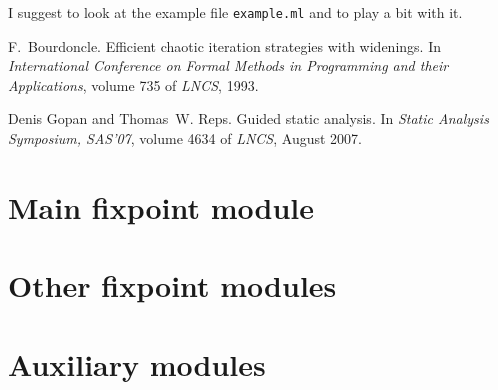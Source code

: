 \documentclass[twoside,10pt,a4paper]{report}
\begin{document}
I suggest to look at the example file \texttt{example.ml}
and to play a bit with it.

\begin{thebibliography}{Bou93}

F.~Bourdoncle.
\newblock Efficient chaotic iteration strategies with widenings.
\newblock In {\em International Conference on Formal Methods in Programming and
  their Applications}, volume 735 of {\em LNCS}, 1993.

Denis Gopan and Thomas~W. Reps.
\newblock Guided static analysis.
\newblock In {\em Static Analysis Symposium, SAS'07}, volume 4634 of {\em
  LNCS}, August 2007.

\end{thebibliography}

%
%

\part{Main fixpoint module}


\part{Other fixpoint modules}





\part{Auxiliary modules}








\appendix
\printindex
\end{document}
